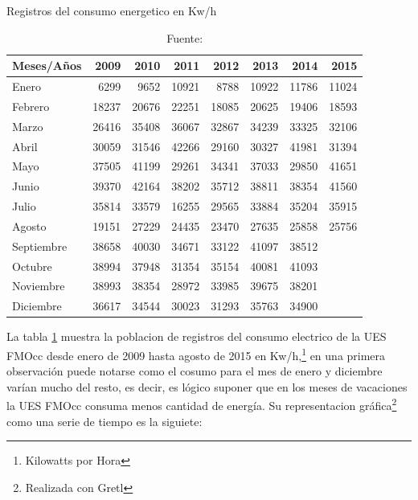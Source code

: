 \documentclass[12pt,letterpaper]{report}
\begin{document}
\begin{table}[ht]
\caption{Registros del consumo energetico en Kw/h} \label{Datos}
\centering
\begin{tabular}{lrrrrrrr}
\hline
  \hline
  Meses/Años & 2009& 2010& 2011& 2012& 2013& 2014& 2015 \\ 
  \hline
Enero    &6299&	9652&	10921&	8788&	10922&	11786&	11024 \\
    \hline
Febrero    &18237&	20676&	22251&	18085&	20625&	19406&	18593 \\
    \hline
Marzo    &26416&	35408&	36067&	32867&	34239&	33325&	32106 \\
    \hline
Abril    &30059&	31546&	42266&	29160&	30327&	41981&	31394 \\
    \hline
Mayo    &37505&	41199&	29261&	34341&	37033&	29850&	41651 \\
    \hline
Junio    &39370&	42164&	38202&	35712&	38811&	38354&	41560 \\
    \hline
Julio    &35814&	33579&	16255&	29565&	33884&	35204&	35915 \\
    \hline
Agosto    &19151&	27229&	24435&	23470&	27635&	25858&	25756 \\
    \hline
Septiembre    &38658&	40030&	34671&	33122&	41097&38512	& \\
    \hline
Octubre  &38994&	37948&	31354&	35154&	40081&	41093& \\
    \hline
Noviembre  &38993&	38354&	28972&	33985&	39675&	38201& \\
    \hline
Diciembre    &36617&	34544&	30023&	31293&	35763&	34900& \\	

\hline
   \hline
\end{tabular}
\caption*{Fuente: \cite{ANelson}}
\end{table}

La tabla \ref{Datos} muestra la poblacion de registros del consumo electrico de la UES FMOcc desde enero de 2009 hasta agosto de 2015 en Kw/h,\footnote{Kilowatts por Hora} en una primera observación puede notarse como el cosumo para el mes de enero y diciembre varían mucho del resto, es decir, es lógico suponer que en los meses de vacaciones la UES FMOcc consuma menos cantidad de energía.
\newpage
Su representacion gráfica\footnote{Realizada con Gretl} como una serie de tiempo es la siguiete:
\end{document}
